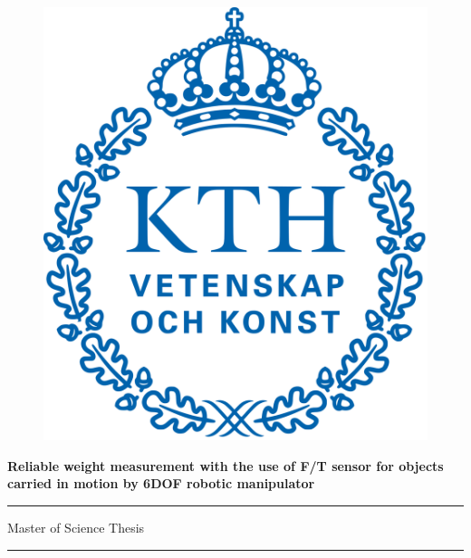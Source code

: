 
\thispagestyle{empty}
\setcounter{page}{0}
\setcounter{tocdepth}{2}

\newcommand{\pt}[4]{\dotnode(#2,#3){#1} \uput[#4](#2,#3){#1}}

\begin{center}

\begin{figure}[H]
  \begin{center}
    \includegraphics[scale=0.1]{images/title/kth.png}
  \end{center}
\end{figure}

\vspace{3ex}


\vspace*{10ex}

{\Huge \bf Reliable weight measurement with the use of F/T sensor for objects
carried in motion by 6DOF robotic manipulator}

\vspace{5ex}

\rule{\linewidth}{.5pt}

\vspace{1ex}
{\huge Master of Science Thesis}
\rule{\linewidth}{.5pt}

\vspace{5ex}


\end{center}

